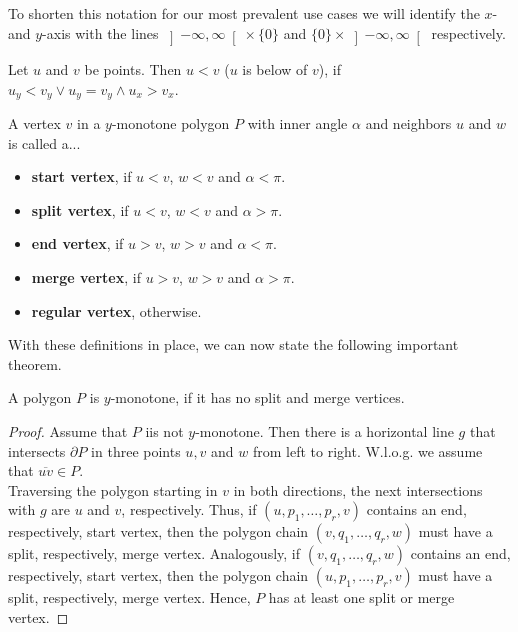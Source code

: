         To shorten this notation for our most prevalent use cases we will identify the $x$- and $y$-axis with the lines $\left] -\infty, \infty \right[ \times \{0\}$ and $\{0\} \times \left] -\infty, \infty \right[$ respectively.

        \begin{definition} 
            Let $u$ and $v$ be points. Then $u < v$ ($u$ is below of $v$), if $u_y < v_y \lor u_y = v_y \land u_x > v_x$. 
        \end{definition}

        \begin{definition}
            A vertex $v$ in a $y$-monotone polygon $P$ with inner angle $\alpha$ and neighbors $u$ and $w$ is called a...
            \begin{itemize}[itemsep=-3pt]
                \item \textbf{start vertex}, if $u < v$, $w < v$ and $\alpha < \pi$.
                \item \textbf{split vertex}, if $u < v$, $w < v$ and $\alpha > \pi$.
                \item \textbf{end vertex}, if $u > v$, $w > v$ and $\alpha < \pi$.
                \item \textbf{merge vertex}, if $u > v$, $w > v$ and $\alpha > \pi$.
                \item \textbf{regular vertex}, otherwise.
            \end{itemize}
        \end{definition}

        With these definitions in place, we can now state the following important theorem.

        \begin{theorem}
            A polygon $P$ is $y$-monotone, if it has no split and merge vertices.
        \end{theorem}
        \begin{proof}
            Assume that $P$ iis not $y$-monotone. Then there is a horizontal line $g$ that intersects $\partial P$ in three points $u, v$ and $w$ from left to right. W.l.o.g. we assume that $\overline{uv} \in P$. \\
            Traversing the polygon starting in $v$ in both directions, the next intersections with $g$ are $u$ and $v$, respectively. Thus, if $(u, p_1, \dots, p_r, v)$ contains an end, respectively, start vertex, then the polygon chain $(v, q_1, \dots, q_r, w)$ must have a split, respectively, merge vertex. Analogously, if $(v, q_1, \dots, q_r, w)$ contains an end, respectively, start vertex, then the polygon chain $(u, p_1, \dots, p_r, v)$ must have a split, respectively, merge vertex. Hence, $P$ has at least one split or merge vertex.
        \end{proof}

